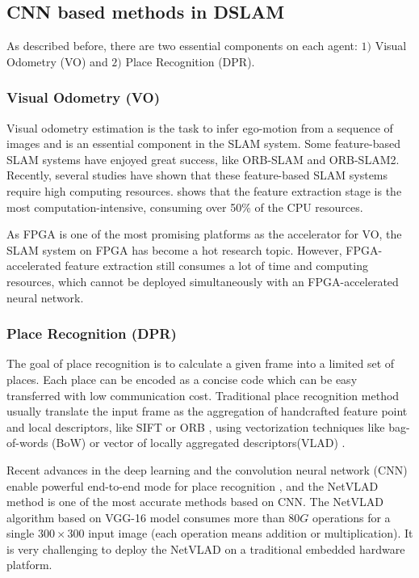 \label{sec:background}
\subsection{CNN based methods in DSLAM}
As described before, there are two essential components on each agent: $1)$ Visual Odometry (VO) and $2)$ Place Recognition (DPR).

\subsubsection{Visual Odometry (VO)}

Visual odometry estimation is the task to infer ego-motion from a sequence of images and is an essential component in the SLAM system. Some feature-based SLAM systems have enjoyed great success, like ORB-SLAM\cite{DBLP:journals/trob/Mur-ArtalMT15} and ORB-SLAM2\cite{Mur-Artal:2017281}. Recently, several studies have shown that these feature-based SLAM systems require high computing resources. \cite{Fang2017FPGAbasedOF} shows that the feature extraction stage is the most computation-intensive, consuming over 50\% of the CPU resources.

As FPGA is one of the most promising platforms as the accelerator for VO, the SLAM system on FPGA has become a hot research topic. However, FPGA-accelerated feature extraction still consumes a lot of time and computing resources, which cannot be deployed simultaneously with an FPGA-accelerated neural network.

\subsubsection{Place Recognition (DPR)}

The goal of place recognition is to calculate a given frame into a limited set of places. Each place can be encoded as a concise code which can be easy transferred with low communication cost. Traditional place recognition method usually translate the input frame as the aggregation of handcrafted feature point and local descriptors, like SIFT \cite{Lowe:2004e6e} or ORB \cite{Mur-Artal:2017281}, using vectorization techniques like bag-of-words (BoW) \cite{Galvez-Lopez:2012c94} or vector of locally aggregated descriptors(VLAD) \cite{Jegou:2010f45}.

Recent advances in the deep learning and the convolution neural network (CNN) enable powerful end-to-end mode for place recognition \cite{Noh:2017d0b, Arandjelovic:2017997}, and the NetVLAD method is one of the most accurate methods based on CNN. The NetVLAD algorithm based on VGG-16 model \cite{Simonyan:20143be} consumes more than $80G$ operations for a single $300 \times 300$ input image (each operation means addition or  multiplication). It is very challenging to deploy the NetVLAD on a traditional embedded hardware platform.

